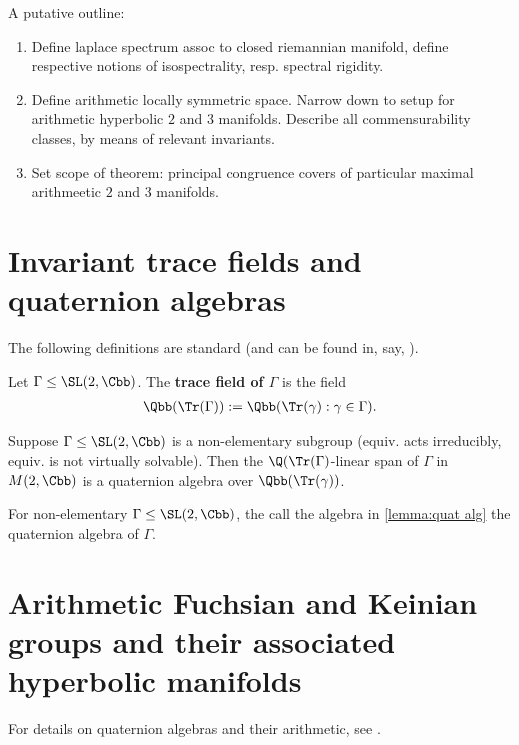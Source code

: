 A putative outline:
\begin{enumerate}
	\item Define laplace spectrum assoc to closed riemannian manifold, define respective notions of isospectrality, resp. spectral rigidity.
	\item Define arithmetic locally symmetric space. Narrow down to setup for arithmetic hyperbolic $2$ and $3$ manifolds. Describe all commensurability classes, by means of relevant invariants.
	\item Set scope of theorem: principal congruence covers of particular maximal arithmeetic $2$ and $3$ manifolds.
\end{enumerate}


\section{Invariant trace fields and quaternion algebras}

The following definitions are standard (and can be found in, say, \cite[Ch. 3]{maclachlanArithmeticHyperbolic3Manifolds2003}).
\begin{definition}\label{def:trace field}
	Let $\Gamma  \leq \SL(2,\Cbb)$. The \textbf{trace field of $\Gamma$} is the field
	\begin{align*}
		\Qbb(\Tr(\Gamma)):= \Qbb( \Tr(\gamma) : \gamma \in \Gamma).
	\end{align*}
\end{definition}

\begin{lemma}\label{lemma:quat alg}
	Suppose $\Gamma \leq \SL(2,\Cbb)$ is a non-elementary subgroup (equiv. acts irreducibly, equiv. is not virtually solvable). Then the $\Q(\Tr(\Gamma)$-linear span of $\Gamma$ in $M(2,\Cbb)$ is a quaternion algebra over $\Qbb(\Tr(\gamma))$.
\end{lemma}

\begin{definition}\label{def:quat alg}
	For non-elementary $\Gamma \leq \SL(2,\Cbb)$, the call the algebra in \ref{lemma:quat alg} the quaternion algebra of $\Gamma$.
\end{definition}

\section{Arithmetic Fuchsian and Keinian groups and their associated hyperbolic manifolds}
For details on quaternion algebras and their arithmetic, see \cite{maclachlanArithmeticHyperbolic3Manifolds2003}.


